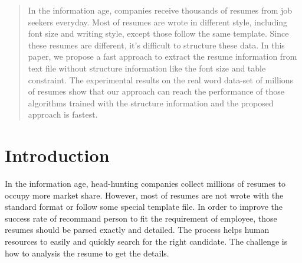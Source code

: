 \documentclass{acm_proc_article-sp}
\begin{document}
\maketitle
\begin{abstract}


In the information age, companies receive thousands of resumes from job seekers everyday. 
Most of resumes are wrote in different style, including font size and writing style, except those follow the same template.
Since these resumes are different, it's difficult to structure these data.
In this paper, we propose a fast approach to extract the resume information from text file without structure information like the font size and table constraint.
The experimental results on the real word data-set of millions of resumes show that our approach can reach the performance of those algorithms trained with the structure information and the proposed approach is fastest.

\end{abstract}


\section{Introduction}

In the information age, head-hunting companies collect millions of resumes to occupy more market share.
However, most of resumes are not wrote with the standard format or follow some special template file.
In order to improve the success rate of recommand person to fit the requirement of employee, those resumes should be parsed exactly and detailed.
The process helps human resources to easily and quickly search for the right candidate.
The challenge is how to analysis the resume to get the details.
\end{document}
